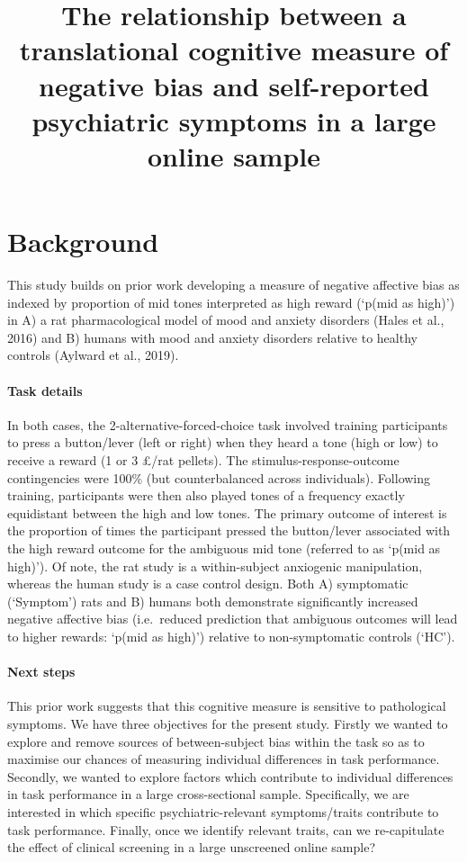 \documentclass[]{article}
\title{The relationship between a translational cognitive measure of negative
bias and self-reported psychiatric symptoms in a large online sample}
\author{}
\date{}
\let\oldparagraph\paragraph
\renewcommand{\paragraph}[1]{\oldparagraph{#1}\mbox{}}
\begin{document}
\maketitle

\section{Background}\label{background}

This study builds on prior work developing a measure of negative
affective bias as indexed by proportion of mid tones interpreted as high
reward (`p(mid as high)') in A) a rat pharmacological model of mood and
anxiety disorders (Hales et al., 2016) and B) humans with mood and
anxiety disorders relative to healthy controls (Aylward et al., 2019).

\paragraph{Task details}\label{task-details}

In both cases, the 2-alternative-forced-choice task involved training
participants to press a button/lever (left or right) when they heard a
tone (high or low) to receive a reward (1 or 3 £/rat pellets). The
stimulus-response-outcome contingencies were 100\% (but counterbalanced
across individuals). Following training, participants were then also
played tones of a frequency exactly equidistant between the high and low
tones. The primary outcome of interest is the proportion of times the
participant pressed the button/lever associated with the high reward
outcome for the ambiguous mid tone (referred to as `p(mid as high)'). Of
note, the rat study is a within-subject anxiogenic manipulation, whereas
the human study is a case control design. Both A) symptomatic
(`Symptom') rats and B) humans both demonstrate significantly increased
negative affective bias (i.e.~reduced prediction that ambiguous outcomes
will lead to higher rewards: `p(mid as high)') relative to
non-symptomatic controls (`HC').

\paragraph{Next steps}\label{next-steps}

This prior work suggests that this cognitive measure is sensitive to
pathological symptoms. We have three objectives for the present study.
Firstly we wanted to explore and remove sources of between-subject bias
within the task so as to maximise our chances of measuring individual
differences in task performance. Secondly, we wanted to explore factors
which contribute to individual differences in task performance in a
large cross-sectional sample. Specifically, we are interested in which
specific psychiatric-relevant symptoms/traits contribute to task
performance. Finally, once we identify relevant traits, can we
re-capitulate the effect of clinical screening in a large unscreened
online sample?
\end{document}
